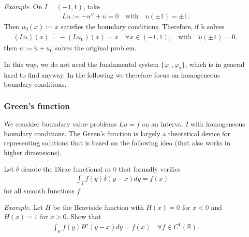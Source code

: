 \documentclass[12pt,a4paper]{article}
\newcommand{\IR}{\mathbb{R}}
\begin{document}
    
    \emph{Example}.
    On $I = (-1, 1)$,
    take
    \begin{align}
        L u := -u'' + u = 0
        \quad\text{with}\quad
        u(\pm 1) = \pm 1
        .
    \end{align}
    Then $u_0(x) := x$ satisfies the boundary conditions.
    Therefore, if $\tilde{u}$ solves
    \begin{align}
        (L \tilde{u})(x) \stackrel{!}{=} -(L u_0)(x) = x
        \quad
        \forall x \in (-1, 1),
        \quad\text{with}\quad
        \tilde{u}(\pm 1) = 0,
    \end{align}
    then $u := \tilde{u} + u_0$ solves the original problem.
    
    
    In this way,
    we do not need 
    the fundamental system $\{ \varphi_1, \varphi_2 \}$,
    which is in general hard to find anyway.
    In the following we therefore focus on 
    homogeneous boundary conditions.
    
    
    \subsubsection*{Green's function}
    
    We consider boundary value problems 
    $L u = f$
    on an interval $I$
    with homogeneous boundary conditions.
    The Green's function is largely a theoretical device
    for representing solutions 
    that is based on 
    the following idea
    (that also works in higher dimensions).
    
    
    Let $\delta$ denote the Dirac functional at $0$
    that formally verifies 
    \begin{align}
        \label{e:delta}
        \int_I f(y) \delta(y - x) dy
        =
        f(x)
        \quad
    \end{align}
    for all smooth functions $f$.
    
    
    \emph{Example}.
    Let $H$ be the Heaviside function
    with $H(x) = 0$ for $x < 0$
    and $H(x) = 1$ for $x > 0$.
    Show that
    \begin{align}
        \int_{\IR} f(y) H'(y - x) dy
        =
        f(x)
        \quad
        \forall f \in C^1(\IR)
        .
    \end{align}
    
\end{document}
